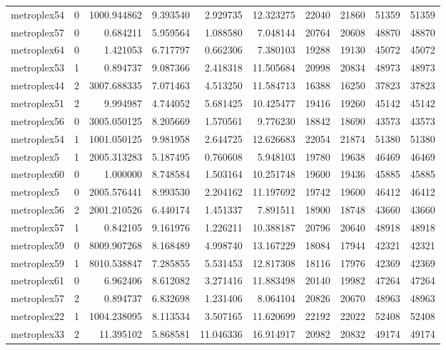 \begin{longtable}{|l|r|r|r|r|r|r|r|r|r|}
metroplex54 & 0 & 1000.944862 & 9.393540 & 2.929735 & 12.323275 & 22040 & 21860 & 51359 & 51359 \\
metroplex57 & 0 & 0.684211 & 5.959564 & 1.088580 & 7.048144 & 20764 & 20608 & 48870 & 48870 \\
metroplex64 & 0 & 1.421053 & 6.717797 & 0.662306 & 7.380103 & 19288 & 19130 & 45072 & 45072 \\
metroplex53 & 1 & 0.894737 & 9.087366 & 2.418318 & 11.505684 & 20998 & 20834 & 48973 & 48973 \\
metroplex44 & 2 & 3007.688335 & 7.071463 & 4.513250 & 11.584713 & 16388 & 16250 & 37823 & 37823 \\
metroplex51 & 2 & 9.994987 & 4.744052 & 5.681425 & 10.425477 & 19416 & 19260 & 45142 & 45142 \\
metroplex56 & 0 & 3005.050125 & 8.205669 & 1.570561 & 9.776230 & 18842 & 18690 & 43573 & 43573 \\
metroplex54 & 1 & 1001.050125 & 9.981958 & 2.644725 & 12.626683 & 22054 & 21874 & 51380 & 51380 \\
metroplex5 & 1 & 2005.313283 & 5.187495 & 0.760608 & 5.948103 & 19780 & 19638 & 46469 & 46469 \\
metroplex60 & 0 & 1.000000 & 8.748584 & 1.503164 & 10.251748 & 19600 & 19436 & 45885 & 45885 \\
metroplex5 & 0 & 2005.576441 & 8.993530 & 2.204162 & 11.197692 & 19742 & 19600 & 46412 & 46412 \\
metroplex56 & 2 & 2001.210526 & 6.440174 & 1.451337 & 7.891511 & 18900 & 18748 & 43660 & 43660 \\
metroplex57 & 1 & 0.842105 & 9.161976 & 1.226211 & 10.388187 & 20796 & 20640 & 48918 & 48918 \\
metroplex59 & 0 & 8009.907268 & 8.168489 & 4.998740 & 13.167229 & 18084 & 17944 & 42321 & 42321 \\
metroplex59 & 1 & 8010.538847 & 7.285855 & 5.531453 & 12.817308 & 18116 & 17976 & 42369 & 42369 \\
metroplex61 & 0 & 6.962406 & 8.612082 & 3.271416 & 11.883498 & 20140 & 19982 & 47264 & 47264 \\
metroplex57 & 2 & 0.894737 & 6.832698 & 1.231406 & 8.064104 & 20826 & 20670 & 48963 & 48963 \\
metroplex22 & 1 & 1004.238095 & 8.113534 & 3.507165 & 11.620699 & 22192 & 22022 & 52408 & 52408 \\
metroplex33 & 2 & 11.395102 & 5.868581 & 11.046336 & 16.914917 & 20982 & 20832 & 49174 & 49174 \\

\end{longtable}
